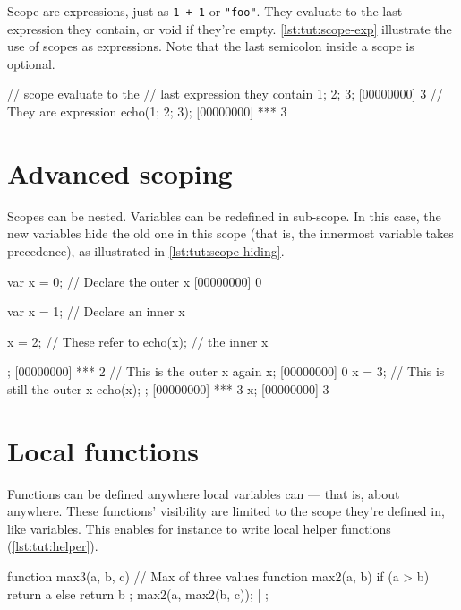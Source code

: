 Scope are expressions, just as \lstinline|1 + 1| or \lstinline|"foo"|.
They evaluate to the last expression they contain, or void if they're
empty. \autoref{lst:tut:scope-exp} illustrate the use of scopes as
expressions. Note that the last semicolon inside a scope is optional.

\begin{urbiscript}[caption=Using scope as expressions,label=lst:tut:scope-exp]
// scope evaluate to the
// last expression they contain
{ 1; 2; 3};
[00000000] 3
// They are expression
echo({1; 2; 3});
[00000000] *** 3
\end{urbiscript}

\section{Advanced scoping}

Scopes can be nested. Variables can be redefined in sub-scope. In this
case, the new variables hide the old one in this scope (that is, the
innermost variable takes precedence), as illustrated in
\autoref{lst:tut:scope-hiding}.

\begin{urbiscript}[caption=Redefining variables in
  subscopes,label=lst:tut:scope-hiding]
var x = 0; // Declare the outer x
[00000000] 0
{
  var x = 1; // Declare an inner x

  x = 2;    // These refer to
  echo(x);  // the inner x
};
[00000000] *** 2
// This is the outer x again
x;
[00000000] 0
{
  x = 3; // This is still the outer x
  echo(x);
};
[00000000] *** 3
x;
[00000000] 3
\end{urbiscript}

\section{Local functions}

Functions can be defined anywhere local variables can --- that is,
about anywhere. These functions' visibility are limited to the scope
they're defined in, like variables. This enables for instance to write
local helper functions (\autoref{lst:tut:helper}).

\begin{urbiscript}[caption=Local helper function, label=lst:tut:helper]
function max3(a, b, c) // Max of three values
{
  function max2(a, b)
  {
    if (a > b)
      return a
    else
      return b
  };
  max2(a, max2(b, c));
} | {};
\end{urbiscript}

